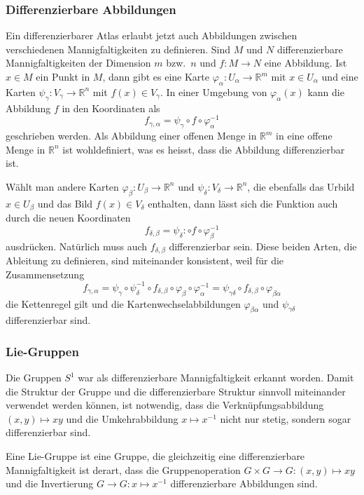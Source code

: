 %
%
\subsubsection{Differenzierbare Abbildungen}
Ein differenzierbarer Atlas erlaubt jetzt auch Abbildungen zwischen
verschiedenen Mannigfaltigkeiten zu definieren.
Sind $M$ und $N$ differenzierbare Mannigfaltigkeiten der Dimension $m$
bzw.~$n$ und $f\colon M\to N$ eine Abbildung.
Ist $x\in M$ ein Punkt in $M$, dann gibt es eine Karte
$\varphi_\alpha\colon U_\alpha\to\mathbb{R}^m$ mit $x\in U_\alpha$
und eine Karten $\psi_\gamma\colon V_\gamma\to\mathbb{R}^n$ mit
$f(x)\in V_\gamma$.
In einer Umgebung von $\varphi_\alpha(x)$ kann die Abbildung $f$
in den Koordinaten als
\[
f_{\gamma,\alpha}
=
\psi_\gamma\circ f \circ \varphi_\alpha^{-1}
\]
geschrieben werden.
Als Abbildung einer offenen Menge in $\mathbb{R}^m$ in eine offene
Menge in $\mathbb{R}^n$ ist wohldefiniert, was es heisst, dass die
Abbildung differenzierbar ist.

Wählt man andere Karten $\varphi_\beta\colon U_\beta\to\mathbb{R}^n$
und $\psi_\delta\colon V_\delta\to\mathbb{R}^n$, die ebenfalls
das Urbild $x\in U_\beta$ und das Bild $f(x)\in V_\delta$ enthalten,
dann lässt sich die Funktion auch durch die neuen Koordinaten
\[
f_{\delta,\beta}
=
\psi_\delta\colon \circ f \circ\varphi_\beta^{-1}
\]
ausdrücken.
Natürlich muss auch $f_{\delta,\beta}$ differenzierbar sein.
Diese beiden Arten, die Ableitung zu definieren, sind miteinander
konsistent, weil für die Zusammensetzung
\[
f_{\gamma,\alpha}
=
\psi_\gamma\circ\psi_\delta^{-1}
\circ
f_{\delta,\beta}
\circ
\varphi_\beta\circ\varphi_\alpha^{-1}
=
\psi_{\gamma\delta}
\circ
f_{\delta,\beta}
\circ
\varphi_{\beta\alpha}
\]
die Kettenregel gilt und die Kartenwechselabbildungen $\varphi_{\beta\alpha}$
und $\psi_{\gamma\delta}$ differenzierbar sind.

%
%
\subsubsection{Lie-Gruppen}
Die Gruppen $S^1$ war als differenzierbare Mannigfaltigkeit erkannt
worden.
Damit die Struktur der Gruppe und die differenzierbare Struktur sinnvoll
miteinander verwendet werden können, ist notwendig, dass die
Verknüpfungsabbildung $(x,y)\mapsto xy$ und die Umkehrabbildung
$x\mapsto x^{-1}$ nicht nur stetig, sondern sogar differenzierbar sind.

\begin{definition}
\label{buch:gruppen:gruppe:def:liegruppe}
Eine Lie-Gruppe ist eine Gruppe, die gleichzeitig eine differenzierbare
Mannigfaltigkeit ist derart, dass die Gruppenoperation
$G\times G\to G:(x,y)\mapsto xy$
und die Invertierung $G\to G: x\mapsto x^{-1}$ differenzierbare Abbildungen
sind.
\end{definition}

